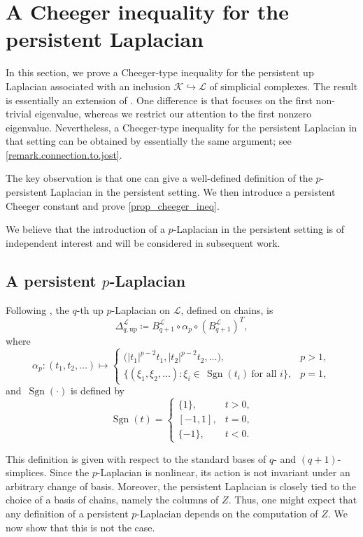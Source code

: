 \documentclass{article}
\newcommand{\KK}{\mathcal{K}}
\newcommand{\LL}{\mathcal{L}}
\newcommand{\sgn}{\,\operatorname{Sgn}}
\begin{document}
\section{A Cheeger inequality for the persistent Laplacian}
\label{sec:cheeger_perslap}

In this section, we prove a Cheeger-type inequality for the persistent up Laplacian associated with an inclusion
\(\KK\hookrightarrow \LL\) of simplicial complexes. The result is essentially an extension of \cite[Proposition 2.1]{jost2024cheeger}. One difference is that \cite{jost2024cheeger} focuses on the first non-trivial eigenvalue, whereas we restrict our attention to the first nonzero eigenvalue. Nevertheless, a Cheeger-type inequality for the persistent Laplacian in that setting can be obtained by essentially the same argument; see \cref{remark.connection.to.jost}.

The key observation is that one can give a well-defined definition of the \(p\)-persistent Laplacian in the persistent setting. We then introduce a persistent Cheeger constant and prove \cref{prop_cheeger_ineq}.

We believe that the introduction of a \(p\)-Laplacian in the persistent setting is of independent interest and will be considered in subsequent work.

\subsection{A persistent \(p\)-Laplacian}\label{sec:pers_p_lap}

Following \cite{jost2024cheeger}, the \(q\)-th up \(p\)-Laplacian on \(\LL\), defined on chains, is
\[
\Delta_{q, \text{up}}^{\LL}
\coloneqq
B_{q+1}^{\LL}\circ \alpha_p\circ
(B_{q+1}^\LL)^T ,
\]
where
\[
\alpha_p:
(t_1,t_2,\ldots)
\mapsto
\begin{cases}
\bigl(|t_1|^{p-2}t_1, |t_2|^{p-2}t_2,\ldots\bigr), & p>1,\\[2mm]
\{(\xi_1,\xi_2,\ldots): \xi_i\in \sgn(t_i)\ \text{for all }i\}, & p=1,
\end{cases}
\]
and \(\sgn(\cdot)\) is defined by
\[
\sgn(t)=
\begin{cases}
\{1\}, & t>0,\\
[-1,1], & t=0,\\
\{-1\}, & t<0.
\end{cases}
\]

This definition is given with respect to the standard bases of \(q\)- and \((q+1)\)-simplices. Since the \(p\)-Laplacian is nonlinear, its action is not invariant under an arbitrary change of basis. Moreover, the persistent Laplacian is closely tied to the choice of a basis of chains, namely the columns of \(Z\). Thus, one might expect that any definition of a persistent \(p\)-Laplacian depends on the computation of \(Z\). We now show that this is not the case.
\end{document}
